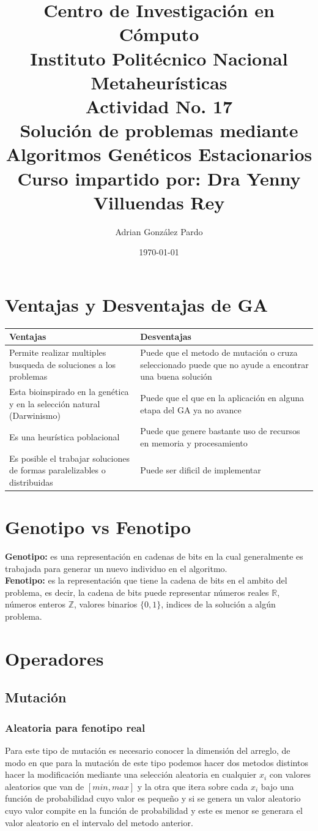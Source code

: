 \documentclass[10pt]{article}
\title{Centro de Investigación en Cómputo\\Instituto Politécnico Nacional\\Metaheurísticas\\Actividad No. 17\\Solución de problemas mediante Algoritmos Genéticos Estacionarios\\Curso impartido por: Dra Yenny Villuendas Rey}
\author{Adrian González Pardo}
\date{\today}
\begin{document}
\maketitle
\section{Ventajas y Desventajas de GA}
\begin{center}
  \begin{tabular}{|p{6cm}|p{6cm}|}
    \hline
    Ventajas & Desventajas \\
    \hline
    Permite realizar multiples busqueda de soluciones a los problemas & Puede que el metodo de mutación o cruza seleccionado puede que no ayude a encontrar una buena solución\\
    \hline
    Esta bioinspirado en la genética y en la selección natural (Darwinismo) & Puede que el que en la aplicación en alguna etapa del GA ya no avance \\
    \hline
    Es una heurística poblacional & Puede que genere bastante uso de recursos en memoria y procesamiento \\
    \hline
    Es posible el trabajar soluciones de formas paralelizables o distribuidas&Puede ser dificil de implementar\\
    \hline
  \end{tabular}
\end{center}
\section{Genotipo vs Fenotipo}
\textbf{Genotipo:} es una representación en cadenas de bits en la cual generalmente es trabajada para generar un nuevo individuo en el algoritmo.
\\
\textbf{Fenotipo:} es la representación que tiene la cadena de bits en el ambito del problema, es decir, la cadena de bits puede representar números reales $\mathbb{R}$, números enteros $\mathbb{Z}$, valores binarios $\{0,1\}$, indices de la solución a algún problema.

\section{Operadores}
\subsection{Mutación}
\subsubsection{Aleatoria para fenotipo real}
Para este tipo de mutación es necesario conocer la dimensión del arreglo, de modo en que para la mutación de este tipo podemos hacer dos metodos distintos hacer la modificación mediante una selección aleatoria en cualquier $x_{i}$ con valores aleatorios que van de $[min,max]$ y la otra que itera sobre cada $x_{i}$ bajo una función de probabilidad cuyo valor es pequeño y si se genera un valor aleatorio cuyo valor compite en la función de probabilidad y este es menor se generara el valor aleatorio en el intervalo del metodo anterior.
\end{document}
